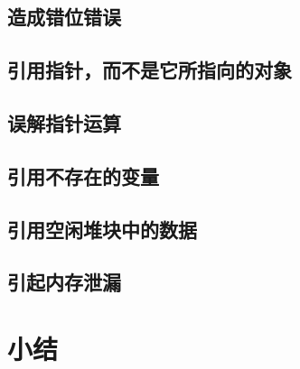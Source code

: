 \subsection{造成错位错误}

\pending

\subsection{引用指针，而不是它所指向的对象}

\pending

\subsection{误解指针运算}

\pending

\subsection{引用不存在的变量}

\pending

\subsection{引用空闲堆块中的数据}

\pending

\subsection{引起内存泄漏}

\pending

\section{小结}

\pending

